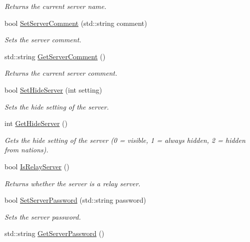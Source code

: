 \begin{DoxyCompactItemize}
\begin{DoxyCompactList}\small\item\em Returns the current server name. \end{DoxyCompactList}\item 
bool \hyperlink{classMethods_abae456c9d07f66cc13dcf496b2b65d4e}{Set\-Server\-Comment} (std\-::string comment)
\begin{DoxyCompactList}\small\item\em Sets the server comment. \end{DoxyCompactList}\item 
\hypertarget{classMethods_aa971e2e35e1b7cc080918a3199584700}{std\-::string \hyperlink{classMethods_aa971e2e35e1b7cc080918a3199584700}{Get\-Server\-Comment} ()}\label{classMethods_aa971e2e35e1b7cc080918a3199584700}

\begin{DoxyCompactList}\small\item\em Returns the current server comment. \end{DoxyCompactList}\item 
bool \hyperlink{classMethods_a2aa8eac9277996514cea4c429cf78342}{Set\-Hide\-Server} (int setting)
\begin{DoxyCompactList}\small\item\em Sets the hide setting of the server. \end{DoxyCompactList}\item 
\hypertarget{classMethods_ac6c3f048240ebca8bbb835e4caab8b19}{int \hyperlink{classMethods_ac6c3f048240ebca8bbb835e4caab8b19}{Get\-Hide\-Server} ()}\label{classMethods_ac6c3f048240ebca8bbb835e4caab8b19}

\begin{DoxyCompactList}\small\item\em Gets the hide setting of the server (0 = visible, 1 = always hidden, 2 = hidden from nations). \end{DoxyCompactList}\item 
\hypertarget{classMethods_a53ec97c30e8cdec66abecd3b1f2d5d15}{bool \hyperlink{classMethods_a53ec97c30e8cdec66abecd3b1f2d5d15}{Is\-Relay\-Server} ()}\label{classMethods_a53ec97c30e8cdec66abecd3b1f2d5d15}

\begin{DoxyCompactList}\small\item\em Returns whether the server is a relay server. \end{DoxyCompactList}\item 
bool \hyperlink{classMethods_a62fe24aedfd44cf477fc4a4a776bebd0}{Set\-Server\-Password} (std\-::string password)
\begin{DoxyCompactList}\small\item\em Sets the server password. \end{DoxyCompactList}\item 
\hypertarget{classMethods_a06a98b05cec73671368be700d39cef4f}{std\-::string \hyperlink{classMethods_a06a98b05cec73671368be700d39cef4f}{Get\-Server\-Password} ()}\label{classMethods_a06a98b05cec73671368be700d39cef4f}


\end{DoxyCompactItemize}
